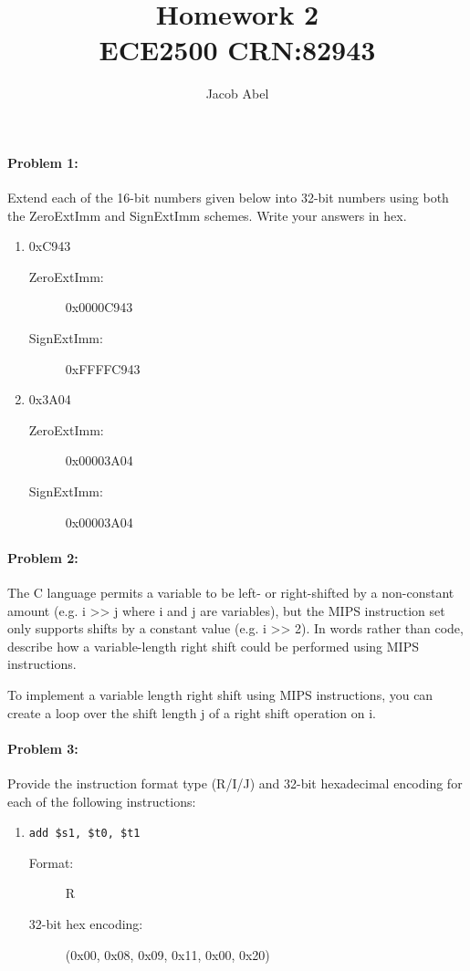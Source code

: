 \documentclass[12pt,letterpaper,titlepage]{article}
\author{Jacob Abel}
\title{	Homework 2
	\\\large ECE2500 CRN:82943
}
\begin{document}
\maketitle
\begin{raggedright}

\paragraph{Problem 1: } Extend each of the 16-bit numbers given below into 32-bit numbers using both the ZeroExtImm and SignExtImm schemes. Write your answers in hex.

\begin{enumerate}
\item 0xC943
\begin{description}
\item[ZeroExtImm:] 0x0000C943
\item[SignExtImm:] 0xFFFFC943
\end{description}
\item 0x3A04
\begin{description}
\item[ZeroExtImm:] 0x00003A04
\item[SignExtImm:] 0x00003A04
\end{description}
\end{enumerate}

\paragraph{Problem 2: }
The C language permits a variable to be left- or right-shifted by a non-constant amount (e.g. i >> j where i and j are variables), but the MIPS instruction set only supports shifts by a constant value (e.g. i >> 2). In words rather than code, describe how a variable-length right shift could be performed using MIPS instructions.

To implement a variable length right shift using MIPS instructions, you can create a loop over the shift length j of a right shift operation on i. 

\paragraph{Problem 3: }
Provide the instruction format type (R/I/J) and 32-bit hexadecimal encoding for each of the following instructions:

\begin{enumerate}
\item \begin{lstlisting}
add $s1, $t0, $t1
      \end{lstlisting}
\begin{description}
\item[Format:] R
\item[32-bit hex encoding:] (0x00, 0x08, 0x09, 0x11, 0x00, 0x20) 


\end{description}
\end{enumerate}
\end{raggedright}
\end{document}
